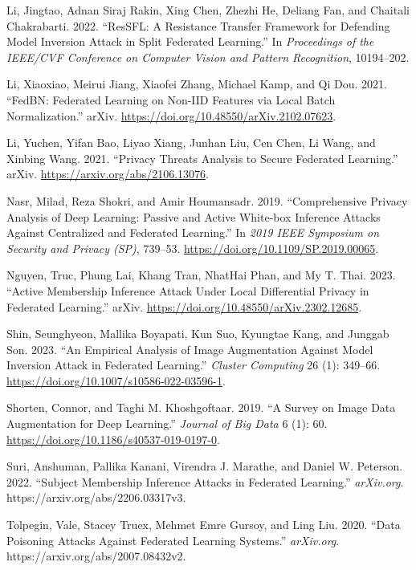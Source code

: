 \begin{CSLReferences}{1}{0}
\leavevmode{}%
Li, Jingtao, Adnan Siraj Rakin, Xing Chen, Zhezhi He, Deliang Fan, and
Chaitali Chakrabarti. 2022. {``{ResSFL}: {A Resistance Transfer
Framework} for {Defending Model Inversion Attack} in {Split Federated
Learning}.''} In \emph{Proceedings of the {IEEE}/{CVF Conference} on
{Computer Vision} and {Pattern Recognition}}, 10194--202.

\leavevmode{}%
Li, Xiaoxiao, Meirui Jiang, Xiaofei Zhang, Michael Kamp, and Qi Dou.
2021. {``{FedBN}: {Federated Learning} on {Non-IID Features} via {Local
Batch Normalization}.''} {arXiv}.
\url{https://doi.org/10.48550/arXiv.2102.07623}.

\leavevmode{}%
Li, Yuchen, Yifan Bao, Liyao Xiang, Junhan Liu, Cen Chen, Li Wang, and
Xinbing Wang. 2021. {``Privacy {Threats Analysis} to {Secure Federated
Learning}.''} {arXiv}. \url{https://arxiv.org/abs/2106.13076}.

\leavevmode{}%
Nasr, Milad, Reza Shokri, and Amir Houmansadr. 2019. {``Comprehensive
{Privacy Analysis} of {Deep Learning}: {Passive} and {Active White-box
Inference Attacks} Against {Centralized} and {Federated Learning}.''} In
\emph{2019 {IEEE Symposium} on {Security} and {Privacy} ({SP})},
739--53. \url{https://doi.org/10.1109/SP.2019.00065}.

\leavevmode{}%
Nguyen, Truc, Phung Lai, Khang Tran, NhatHai Phan, and My T. Thai. 2023.
{``Active {Membership Inference Attack} Under {Local Differential
Privacy} in {Federated Learning}.''} {arXiv}.
\url{https://doi.org/10.48550/arXiv.2302.12685}.

\leavevmode{}%
Shin, Seunghyeon, Mallika Boyapati, Kun Suo, Kyungtae Kang, and Junggab
Son. 2023. {``An Empirical Analysis of Image Augmentation Against Model
Inversion Attack in Federated Learning.''} \emph{Cluster Computing} 26
(1): 349--66. \url{https://doi.org/10.1007/s10586-022-03596-1}.

\leavevmode{}%
Shorten, Connor, and Taghi M. Khoshgoftaar. 2019. {``A Survey on {Image
Data Augmentation} for {Deep Learning}.''} \emph{Journal of Big Data} 6
(1): 60. \url{https://doi.org/10.1186/s40537-019-0197-0}.

\leavevmode{}%
Suri, Anshuman, Pallika Kanani, Virendra J. Marathe, and Daniel W.
Peterson. 2022. {``Subject {Membership Inference Attacks} in {Federated
Learning}.''} \emph{arXiv.org}. https://arxiv.org/abs/2206.03317v3.

\leavevmode{}%
Tolpegin, Vale, Stacey Truex, Mehmet Emre Gursoy, and Ling Liu. 2020.
{``Data {Poisoning Attacks Against Federated Learning Systems}.''}
\emph{arXiv.org}. https://arxiv.org/abs/2007.08432v2.

\end{CSLReferences}
